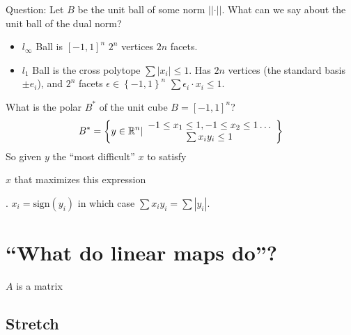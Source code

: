 \begin{example}
Question: Let $B$ be the unit ball of some norm $\left|\left|\cdot\right|\right|$.
What can we say about the unit ball of the dual norm?
\begin{itemize}
\item $l_{\infty}$ Ball is $\left[-1,1\right]^{n}$ $2^{n}$ vertices $2n$
facets.
\item $l_{1}$ Ball is the cross polytope $\sum\left|x_{i}\right|\le1$.
Has $2n$ vertices (the standard basis $\pm e_{i}$), and $2^{n}$
facets $\epsilon\in\left\{ -1,1\right\} ^{n}$ $\sum\epsilon_{i}\cdot x_{i}\le1$.
\end{itemize}
What is the polar $B^{*}$ of the unit cube $B=\left[-1,1\right]^{n}$?
\[
B^{*}=\left\{ y\in\mathbb{R}^{n}|\begin{array}{c}
-1\le x_{1}\le1,-1\le x_{2}\le1\dots\\
\sum x_{i}y_{i}\le1
\end{array}\right\} 
\]
 So given $y$ the ``most difficult'' $x$ to satisfy %
\begin{insight}
$x$ that maximizes this expression%
\end{insight}
. $x_{i}=\text{sign}\left(y_{i}\right)$ in which case $\sum x_{i}y_{i}=\sum\left|y_{i}\right|$.
\end{example}


\section{\textquotedblleft What do linear maps do\textquotedblright ?}

$A$ is a matrix

\subsection{Stretch}

